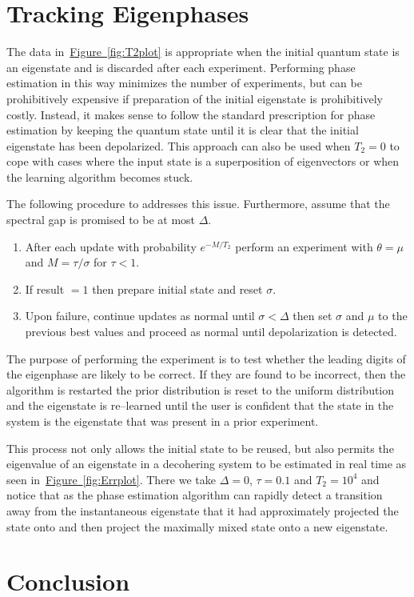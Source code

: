 \documentclass[aps,pra,amsmath,twocolumn,amssymb,superscriptaddress]{revtex4-1}
\newcommand{\fig}[1]{\hyperref[fig:#1]{Figure~\ref*{fig:#1}}}
\begin{document}
\section{Tracking Eigenphases}
The data in~\fig{T2plot} is appropriate when the initial quantum state is an eigenstate and is discarded after each experiment.  Performing phase estimation in this way minimizes the number of experiments, but can be prohibitively expensive if preparation of the initial eigenstate is prohibitively costly.  Instead, it makes sense to follow the standard prescription for phase estimation by keeping the quantum state until it is clear that the initial eigenstate has been depolarized.  This approach can also be used when $T_2=0$ to cope with cases where the input state is a superposition of eigenvectors or when the learning algorithm becomes stuck.

The following procedure to addresses this issue.  Furthermore, assume that the spectral gap is promised to be at most $\Delta$.
\begin{enumerate}
\item After each update with probability $e^{-M/T_2}$ perform an experiment with $\theta=\mu$ and $M=\tau/\sigma$ for $\tau< 1$.
\item If result $=1$ then prepare initial state and reset $\sigma$.
\item Upon failure, continue updates as normal until $\sigma<\Delta$ then set $\sigma$ and $\mu$ to the previous best values and proceed as normal until depolarization is detected.
\end{enumerate}
The purpose of performing the experiment is to test whether the leading digits of the eigenphase are likely to be correct. If they are found to be incorrect, then the algorithm is restarted the prior distribution is reset to the uniform distribution and the eigenstate is re--learned until the user is confident that the state in the system is the eigenstate that was present in a prior experiment.

This process not only allows the initial state to be reused, but also permits the eigenvalue of an eigenstate in a decohering system to be estimated in real time as seen in~\fig{Errplot}.  There we take $\Delta=0$, $\tau=0.1$ and $T_2=10^4$ and notice that as the phase estimation algorithm can rapidly detect a transition away from the instantaneous eigenstate that it had approximately projected the state onto and then project the maximally mixed state onto a new eigenstate.  
\section{Conclusion}
\end{document}
